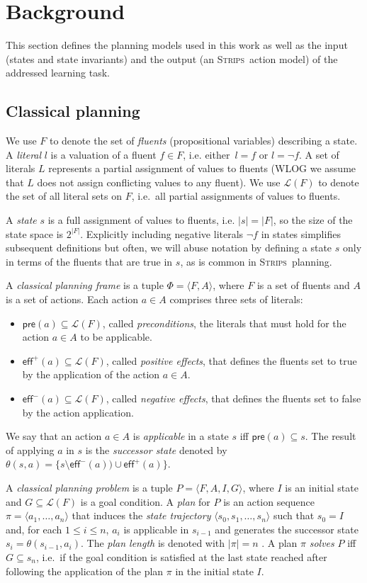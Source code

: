 \documentclass{article}
\newcommand{\tup}[1]{{\langle #1 \rangle}}
\newcommand{\pre}{\mathsf{pre}}     %
\newcommand{\eff}{\mathsf{eff}}     %
\newcommand{\strips}{\textsc{Strips}}     %
\begin{document}
\section{Background}
This section defines the planning models used in this work as well as the input (states and state invariants) and the output (an \strips\ action model) of the addressed learning task.

\subsection{Classical planning}
We use $F$ to denote the set of {\em fluents} (propositional variables) describing a state. A {\em literal} $l$ is a valuation of a fluent $f\in F$, i.e. either~$l=f$ or $l=\neg f$. A set of literals $L$ represents a partial assignment of values to fluents (WLOG we assume that $L$ does not assign conflicting values to any fluent). We use $\mathcal{L}(F)$ to denote the set of all literal sets on $F$, i.e.~all partial assignments of values to fluents.

A {\em state} $s$ is a full assignment of values to fluents, i.e. $|s|=|F|$, so the size of the state space is $2^{|F|}$. Explicitly including negative literals $\neg f$ in states simplifies subsequent definitions but often, we will abuse notation by defining a state $s$ only in terms of the fluents that are true in $s$, as is common in \strips\ planning.

A {\em classical planning frame} is a tuple $\Phi=\tup{F,A}$, where $F$ is a set of fluents and $A$ is a set of actions. Each action $a\in A$ comprises three sets of literals:
\begin{itemize}
\item $\pre(a)\subseteq\mathcal{L}(F)$, called {\em preconditions}, the literals that must hold for the action $a\in A$ to be applicable.
\item $\eff^+(a)\subseteq\mathcal{L}(F)$, called {\em positive effects}, that defines the fluents set to true by the application of the action $a\in A$.
\item $\eff^-(a)\subseteq\mathcal{L}(F)$, called {\em negative effects}, that defines the fluents set to false by the action application.
\end{itemize}
We say that an action $a\in A$ is {\em applicable} in a state $s$ iff $\pre(a)\subseteq s$. The result of applying $a$ in $s$ is the {\em successor state} denoted by $\theta(s,a)=\{s\setminus\eff^-(a))\cup\eff^+(a)\}$.

A {\em classical planning problem} is a tuple $P=\tup{F,A,I,G}$, where $I$ is an initial state and $G\subseteq\mathcal{L}(F)$ is a goal condition. A {\em plan} for $P$ is an action sequence $\pi=\tup{a_1, \ldots, a_n}$ that induces the {\em state trajectory} $\tup{s_0, s_1, \ldots, s_n}$ such that $s_0=I$ and, for each {\small $1\leq i\leq n$}, $a_i$ is applicable in $s_{i-1}$ and generates the successor state $s_i=\theta(s_{i-1},a_i)$. The {\em plan length} is denoted with $|\pi|=n$ . A plan $\pi$ {\em solves} $P$ iff $G\subseteq s_n$, i.e.~if the goal condition is satisfied at the last state reached after following the application of the plan $\pi$ in the initial state $I$.
\end{document}

